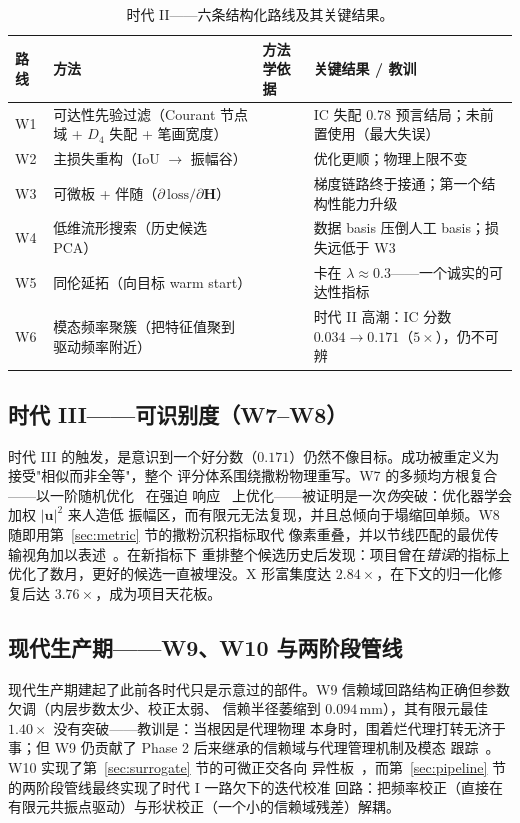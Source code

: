 \documentclass[11pt,a4paper]{article}
\newcommand{\Dfour}{D_4}
\newcommand{\matH}{\mathbf{H}}
\begin{document}
\begin{table}[h]
\centering
\caption{时代 II------六条结构化路线及其关键结果。}
\label{tab:eraII}
\small
\begin{tabular}{@{}p{0.7cm}p{5.1cm}p{2.2cm}p{6.6cm}@{}}
\toprule
路线 & 方法 & 方法学依据 & 关键结果 / 教训 \\
\midrule
W1 & 可达性先验过滤（Courant 节点域 + $\Dfour$ 失配 + 笔画宽度） & \cite{courant1953,pleijel1956,waller1939} & IC 失配 $0.78$ 预言结局；未前置使用（最大失误） \\
W2 & 主损失重构（IoU $\to$ 振幅谷） & \cite{nocedal2006} & 优化更顺；物理上限不变 \\
W3 & 可微板 + 伴随（$\partial\,\text{loss}/\partial\matH$） & \cite{giles2000,baydin2018,paszke2019,fox1968,nelson1976} & 梯度链路终于接通；第一个结构性能力升级 \\
W4 & 低维流形搜索（历史候选 PCA） & \cite{pearson1901,berkooz1993} & 数据 basis 压倒人工 basis；损失远低于 W3 \\
W5 & 同伦延拓（向目标 warm start） & \cite{allgower1990,blake1987} & 卡在 $\lambda\approx0.3$------一个诚实的可达性指标 \\
W6 & 模态频率聚簇（把特征值聚到驱动频率附近） & \cite{pedersen2000,achtziger2007} & 时代 II 高潮：IC 分数 $0.034\to0.171$（$5\times$），仍不可辨 \\
\bottomrule
\end{tabular}
\end{table}

\subsection{时代 III------可识别度（W7--W8）}\label{sec:eraIII}
时代 III 的触发，是意识到一个好分数（$0.171$）仍然不像目标。成功被重定义为接受"相似而非全等"，整个
评分体系围绕撒粉物理重写。W7 的多频均方根复合------以一阶随机优化~\cite{kingma2015} 在强迫
响应~\cite{leissa1969} 上优化------被证明是一次\emph{伪}突破：优化器学会加权 $|\bm{u}|^2$ 来人造低
振幅区，而有限元无法复现，并且总倾向于塌缩回单频。W8 随即用第~\ref{sec:metric} 节的撒粉沉积指标取代
像素重叠，并以节线匹配的最优传输视角加以表述~\cite{chladni1787,cuturi2013,engquist2014}。在新指标下
重排整个候选历史后发现：项目曾在\emph{错误}的指标上优化了数月，更好的候选一直被埋没。X 形富集度达
$2.84\times$，在下文的归一化修复后达 $3.76\times$，成为项目天花板。

\subsection{现代生产期------W9、W10 与两阶段管线}\label{sec:modern}
现代生产期建起了此前各时代只是示意过的部件。W9 信赖域回路结构正确但参数欠调（内层步数太少、校正太弱、
信赖半径萎缩到 $0.094\,\text{mm}$），其有限元最佳 $1.40\times$ 没有突破------教训是：当根因是代理物理
本身时，围着烂代理打转无济于事；但 W9 仍贡献了 Phase 2 后来继承的信赖域与代理管理机制及模态
跟踪~\cite{conn2000,booker1999,allemang1982}。W10 实现了第~\ref{sec:surrogate} 节的可微正交各向
异性板~\cite{reddy2003}，而第~\ref{sec:pipeline} 节的两阶段管线最终实现了时代 I 一路欠下的迭代校准
回路：把频率校正（直接在有限元共振点驱动）与形状校正（一个小的信赖域残差）解耦。
\end{document}
